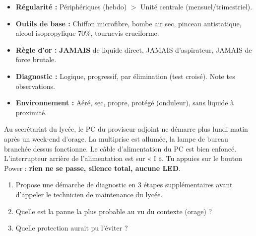 \documentclass[11pt]{article}
\begin{document}
\begin{aretenir}
\begin{itemize}
    \item \textbf{Régularité :} Périphériques (hebdo) $>$ Unité centrale (mensuel/trimestriel).
    \item \textbf{Outils de base :} Chiffon microfibre, bombe air sec, pinceau antistatique, alcool isopropylique 70\%, tournevis cruciforme.
    \item \textbf{Règle d'or :} \textbf{JAMAIS} de liquide direct, JAMAIS d'aspirateur, JAMAIS de force brutale.
    \item \textbf{Diagnostic :} Logique, progressif, par élimination (test croisé). Note tes observations.
    \item \textbf{Environnement :} Aéré, sec, propre, protégé (onduleur), sans liquide à proximité.
\end{itemize}
\end{aretenir}

\begin{exercice}
Au secrétariat du lycée, le PC du proviseur adjoint ne démarre plus lundi matin après un week-end d'orage. La multiprise est allumée, la lampe de bureau branchée dessus fonctionne. Le câble d'alimentation du PC est bien enfoncé. L'interrupteur arrière de l'alimentation est sur « I ». Tu appuies sur le bouton Power : \textbf{rien ne se passe, silence total, aucune LED}.
\begin{enumerate}
    \item Propose une démarche de diagnostic en 3 étapes supplémentaires avant d'appeler le technicien de maintenance du lycée.
    \item Quelle est la panne la plus probable au vu du contexte (orage) ?
    \item Quelle protection aurait pu l'éviter ?
\end{enumerate}
\end{exercice}
\end{document}
